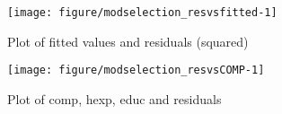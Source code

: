 \documentclass[12pt,a4paper]{article}\usepackage[]{graphicx}\usepackage[]{color}
\newenvironment{knitrout}{}{} %
\begin{document}
\begin{knitrout}
\color{fgcolor}\begin{figure}[htbp]

{\centering \texttt{[image: figure/modselection\_resvsfitted-1]} 

}

\caption[Plot of fitted values and residuals (squared)]{Plot of fitted values and residuals (squared)}\label{fig:modselection_resvsfitted}
\end{figure}


\end{knitrout}
\begin{knitrout}
\color{fgcolor}\begin{figure}[htbp]

{\centering \texttt{[image: figure/modselection\_resvsCOMP-1]} 

}

\caption[Plot of comp, hexp, educ and residuals]{Plot of comp, hexp, educ and residuals}\label{fig:modselection_resvsCOMP}
\end{figure}


\end{knitrout}
\end{document}
